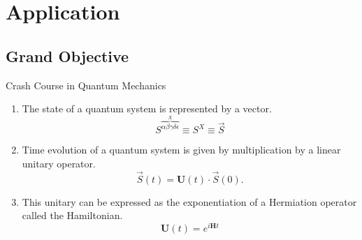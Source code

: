 \documentclass{beamer}
\begin{document}
\section{Application}

\subsection{Grand Objective}
\begin{frame}{Crash Course in Quantum Mechanics}

\begin{enumerate}
\pause
\item The state of a quantum system is represented by a vector.
$$S^{\overbrace{\alpha\beta\gamma\delta\epsilon}^{X}}\equiv S^X \equiv \vec{S}$$
\pause
\item Time evolution of a quantum system is given by multiplication by a linear unitary operator.
$$\vec{S}(t) = \textbf{U}(t)\cdot \vec{S}(0).$$
\pause
\item This unitary can be expressed as the exponentiation of a Hermiation operator called the Hamiltonian.
$$\textbf{U}(t) = e^{i\textbf{H}t}$$
\end{enumerate}

\end{frame}
\end{document}
